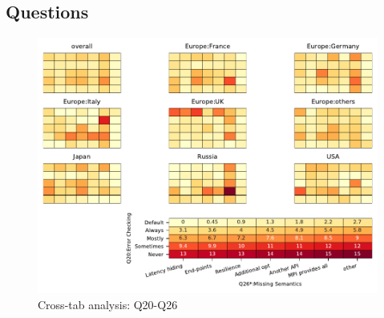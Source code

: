 
\subsection{Questions}


\begin{figure}
\begin{center}
\includegraphics[width=12cm]{../pdfs/Q20-Q26.pdf}
\caption{Cross-tab analysis: Q20-Q26}
\label{fig:Q20-Q26}
\end{center}
\end{figure}
